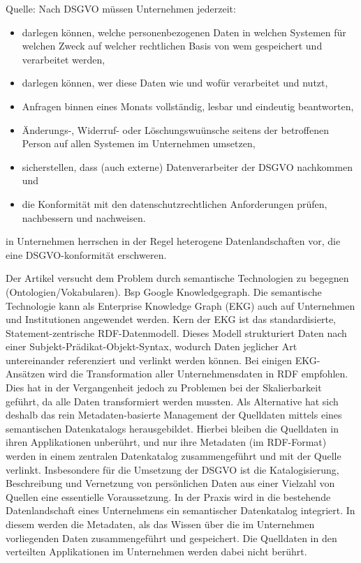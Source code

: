 Quelle: \cite{Brockmann2018}
Nach DSGVO müssen Unternehmen jederzeit: 
\begin{itemize}
\item	darlegen können, welche personenbezogenen Daten in welchen
Systemen für welchen Zweck auf welcher rechtlichen Basis von
wem gespeichert und verarbeitet werden,
\item darlegen können, wer diese Daten wie und wofür verarbeitet
und nutzt,
\item Anfragen binnen eines Monats vollständig, lesbar und eindeutig
beantworten,
\item Änderungs-, Widerruf- oder Löschungswuünsche seitens der
betroffenen Person auf allen Systemen im Unternehmen umsetzen,
\item sicherstellen, dass (auch externe) Datenverarbeiter der DSGVO
nachkommen und
\item die Konformität mit den datenschutzrechtlichen Anforderungen
prüfen, nachbessern und nachweisen.

\end{itemize}

in Unternehmen herrschen in der Regel heterogene Datenlandschaften vor, die eine DSGVO-konformität erschweren.

Der Artikel versucht dem Problem durch semantische Technologien zu begegnen (Ontologien/Vokabularen). Bsp Google Knowledgegraph.
Die semantische Technologie kann als Enterprise Knowledge
Graph (EKG) auch auf Unternehmen und Institutionen angewendet
werden.
Kern der EKG ist das standardisierte, Statement-zentrische
RDF-Datenmodell. Dieses Modell strukturiert Daten nach einer
Subjekt-Prädikat-Objekt-Syntax, wodurch Daten jeglicher Art
untereinander referenziert und verlinkt werden können.
Bei einigen EKG-Ansätzen wird die Transformation aller Unternehmensdaten
in RDF empfohlen. Dies hat in der Vergangenheit
jedoch zu Problemen bei der Skalierbarkeit geführt, da alle
Daten transformiert werden mussten. Als Alternative hat sich
deshalb das rein Metadaten-basierte Management der Quelldaten
mittels eines semantischen Datenkatalogs herausgebildet. Hierbei
bleiben die Quelldaten in ihren Applikationen unberührt,
und nur ihre Metadaten (im RDF-Format) werden in einem zentralen
Datenkatalog zusammengeführt und mit der Quelle verlinkt.
Insbesondere für die Umsetzung der DSGVO ist die Katalogisierung,
Beschreibung und Vernetzung von persönlichen Daten
aus einer Vielzahl von Quellen eine essentielle Voraussetzung.
In der Praxis wird in die bestehende Datenlandschaft eines
Unternehmens ein semantischer Datenkatalog integriert. In diesem
werden die Metadaten, als das Wissen über die im Unternehmen
vorliegenden Daten zusammengeführt und gespeichert.
Die Quelldaten in den verteilten Applikationen im Unternehmen
werden dabei nicht berührt.
